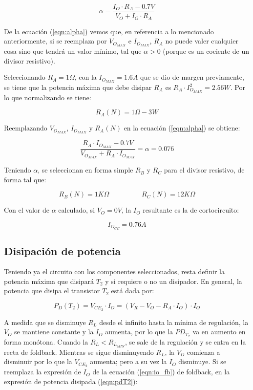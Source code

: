 \begin{equation}
\alpha = \frac{I_O \cdot R_A - 0.7V}{V_O + I_O \cdot R_A}
\label{eqn:alpha}
\end{equation}

De la ecuaci\'on (\ref{eqn:alpha}) vemos que, en referencia a lo mencionado anteriormente, si se reemplaza por $V_{O_{MAX}}$ e $I_{O_{MAX}}$, $R_A$ no puede valer cualquier cosa sino que tendr\'a un valor m\'inimo, tal que $\alpha > 0$ (porque es un cociente de un divisor resistivo).\par
Seleccionando $R_A = 1\Omega$, con la $I_{O_{MAX}} = 1.6A$ que se dio de margen previamente, se tiene que la potencia m\'axima que debe disipar $R_A$ es $R_A \cdot I^2_{O_{MAX}} = 2.56W$. Por lo que normalizando se tiene:

$$R_A(N) = 1\Omega - 3W$$

Reemplazando $V_{O_{MAX}}$, $I_{O_{MAX}}$ y $R_A(N)$ en la ecuaci\'on (\ref{eqn:alpha}) se obtiene:

$$\frac{R_A \cdot I_{O_{MAX}}- 0.7V}{V_{O_{MAX}} + R_A \cdot I_{O_{MAX}}} = \alpha = 0.076$$

Teniendo $\alpha$, se seleccionan en forma simple $R_B$ y $R_C$ para el divisor resistivo, de forma tal que:

$$R_B(N) = 1K\Omega \hspace{2cm} R_C(N) = 12K\Omega$$

Con el valor de $\alpha$ calculado, si $V_O = 0V$, la $I_O$ resultante es la de cortocircuito:

$$I_{O_{CC}} = 0.76A$$


\subsection{Disipaci\'on de potencia}

Teniendo ya el circuito con los componentes seleccionados, resta definir la potencia m\'axima que disipar\'a $T_2$ y si requiere o no un disipador. 
En general, la potencia que disipa el transistor $T_2$ est\'a dada por:

\begin{equation}
P_D(T_2) = V_{CE_2} \cdot I_O = (V_R - V_O - R_A \cdot I_O) \cdot I_O
\label{eqn:pdT2}
\end{equation}

A medida que se disminuye $R_L$ desde el infinito hasta la m\'inima de regulaci\'on, la $V_O$ se mantiene constante y la $I_O$ aumenta, por lo que la $PD_{T_2}$ va en aumento en forma mon\'otona. Cuando la $R_L < R_{L_{MIN}}$, se sale de la regulaci\'on y se entra en la recta de foldback. Mientras se sigue disminuyendo $R_L$, la $V_O$ comienza a disminuir por lo que la $V_{CE_2}$ aumenta; pero a su vez la $I_O$ disminuye. Si se reemplaza la expresi\'on de $I_O$ de la ecuaci\'on (\ref{eqn:io_fb}) de foldback, en la expresi\'on de potencia disipada (\ref{eqn:pdT2}):

